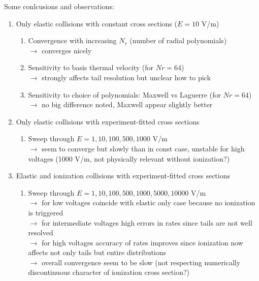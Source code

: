 \documentclass[mathserif, aspectratio=169]{beamer}
\begin{document}
\begin{frame}
Some conlcusions and observations:
\begin{enumerate}
\item Only elastic collisions with constant cross sections ($E=10$ V/m)
\begin{enumerate}
\item Convergence with increasing $N_r$ (number of radial polynomials)
\\ $\rightarrow$ converges nicely
\item Sensitivity to basis thermal velocity (for $Nr = 64$)
\\ $\rightarrow$ strongly affects tail resolution but unclear how to pick
\item Sensitivity to choice of polynomials: Maxwell vs Laguerre (for $Nr = 64$)
\\ $\rightarrow$ no big difference noted, Maxwell appear slightly better
\end{enumerate}
\item Only elastic collisions with experiment-fitted cross sections
\begin{enumerate}
\item Sweep through $E = 1, 10, 100, 500, 1000$ V/m
\\ $\rightarrow$ seem to converge but slowly than in const case, unstable for high voltages (1000 V/m, not physically relevant without ionization?)
\end{enumerate}
\item Elastic and ionization collisions with experiment-fitted cross sections
\begin{enumerate}
\item Sweep through $E = 1, 10, 100, 500, 1000, 5000, 10000$ V/m
\\ $\rightarrow$ for low voltages coincide with elastic only case because no ionization is triggered
\\ $\rightarrow$ for intermediate voltages high errors in rates since tails are not well resolved
\\ $\rightarrow$ for high voltages accuracy of rates improves since ionization now affects not only tails but entire distributions
\\ $\rightarrow$ overall convergence seem to be slow (not respecting numerically discontinuous character of ionization cross section?)
\end{enumerate}
\end{enumerate}

\end{frame}






\end{document}
